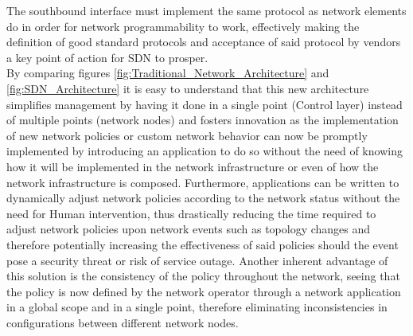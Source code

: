 The southbound interface must implement the same protocol as network elements do in order for network programmability to work, effectively making the definition of good standard protocols and acceptance of said protocol by vendors a key point of action for \gls{SDN} to prosper.\\
%
By comparing figures \ref{fig:Traditional_Network_Architecture} and \ref{fig:SDN_Architecture} it is easy to understand that this new architecture simplifies management by having it done in a single point (Control layer) instead of multiple points (network nodes) and fosters innovation as the implementation of new network policies or custom network behavior can now be promptly implemented by introducing an application to do so without the need of knowing how it will be implemented in the network infrastructure or even of how the network infrastructure is composed.
Furthermore, applications can be written to dynamically adjust network policies according to the network status without the need for Human intervention, thus drastically reducing the time required to adjust network policies upon network events such as topology changes and therefore potentially increasing the effectiveness of said policies should the event pose a security threat or risk of service outage.
Another inherent advantage of this solution is the consistency of the policy throughout the network, seeing that the policy is now defined by the network operator through a network application in a global scope and in a single point, therefore eliminating inconsistencies in configurations between different network nodes.\\
%

